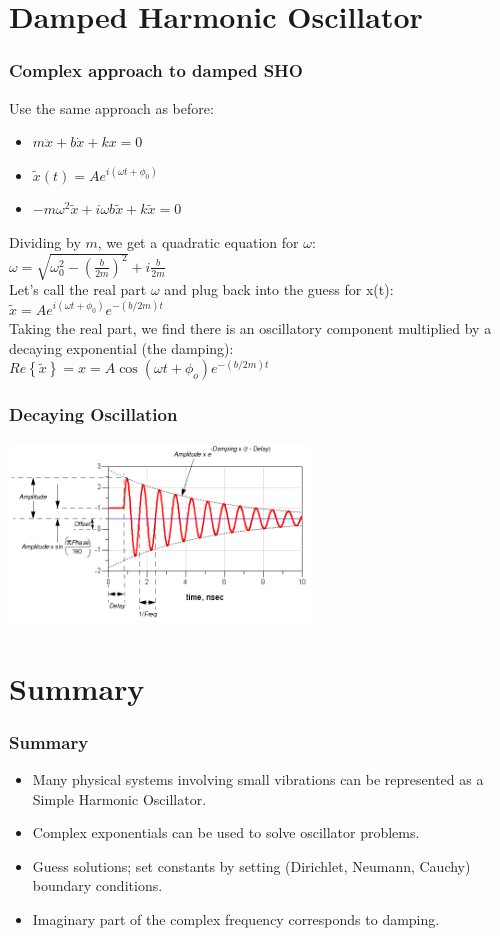 \documentclass[pdf,hideothersubsections]{beamer}
\begin{document}
\section{Damped Harmonic Oscillator}
\begin{frame}
\frametitle{Complex approach to damped SHO}
Use the same approach as before:
\begin{itemize}
\item $m \ddot{x} + b \dot{x} + k x = 0$
\pause
\item $\tilde{x}(t) = A e^{i (\omega t + \phi_0)}$
\pause
\item $-m \omega^2 \tilde{x} + i \omega b \tilde{x} + k \tilde{x} = 0$
\end{itemize}
\pause
Dividing by $m$, we get a quadratic equation for $\omega$: \\
\pause
$\omega = \sqrt{\omega_0^2 - (\frac{b}{2 m})^2} + i \frac{b}{2 m}$ \\
\pause
Let's call the real part $\omega$ and plug back into the guess for x(t):
\pause
$\tilde{x} = A e^{i (\omega t + \phi_0)} e^{-(b/2 m) t}$\\
\pause
Taking the real part, we find there is an oscillatory component multiplied by a decaying exponential (the damping): \\
\pause
$Re\left\{\tilde{x}\right\} = x = A \cos(\omega t + \phi_o) e^{-(b/2 m) t}$

\end{frame}

\begin{frame}
\frametitle{Decaying Oscillation}

\centering
\includegraphics[width=8cm]{damped_sine.png}

\end{frame}

\section{Summary}
\begin{frame}
\frametitle{Summary}
\begin{itemize}
\item Many physical systems involving small vibrations can be represented as a Simple Harmonic Oscillator.
\pause
\item Complex exponentials can be used to solve oscillator problems.
\pause
\item Guess solutions; set constants by setting (Dirichlet, Neumann, Cauchy) boundary conditions.
\pause
\item Imaginary part of the complex frequency corresponds to damping.
\end{itemize}
\end{frame}
\end{document}
